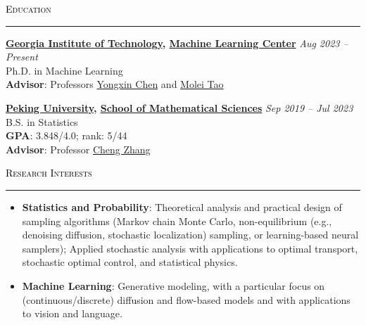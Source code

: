 \documentclass{resume} %
\renewenvironment{rSection}[1]{
\sectionskip
\textcolor{black}{\textsc{#1}}
\sectionlineskip
\hrule
\begin{list}{}{
\setlength{\leftmargin}{1.5em}
}
\item[]
}{
\end{list}
}
\begin{document}
\begin{rSection}{Education}
{\bf \href{https://www.gatech.edu/}{Georgia Institute of Technology}, \href{https://ml.gatech.edu/}{Machine Learning Center}} \hfill {\em Aug 2023 -- Present} 
\\ Ph.D. in Machine Learning\hfill
\\ \textbf{Advisor}: Professors \href{https://yongxin.ae.gatech.edu/}{Yongxin Chen} and \href{https://mtao8.math.gatech.edu/index.html}{Molei Tao}

{\bf \href{https://www.pku.edu.cn/}{Peking University}, \href{https://www.math.pku.edu.cn/}{School of Mathematical Sciences}} \hfill {\em Sep 2019 -- Jul 2023} 
\\ B.S. in Statistics
\\ \textbf{GPA}: 3.848/4.0; rank: 5/44 \hfill
\\ \textbf{Advisor}: Professor \href{https://zcrabbit.github.io/}{Cheng Zhang} 
\end{rSection}

\begin{rSection}{Research Interests}
    \begin{itemize}[leftmargin=0in]
        \item \textbf{Statistics and Probability}: Theoretical analysis and practical design of sampling algorithms (Markov chain Monte Carlo, non-equilibrium (e.g., denoising diffusion, stochastic localization) sampling, or learning-based neural samplers); Applied stochastic analysis with applications to optimal transport, stochastic optimal control, and statistical physics.
        \item \textbf{Machine Learning}: Generative modeling, with a particular focus on (continuous/discrete) diffusion and flow-based models and with applications to vision and language.
    \end{itemize}
\end{rSection}


\end{document}
